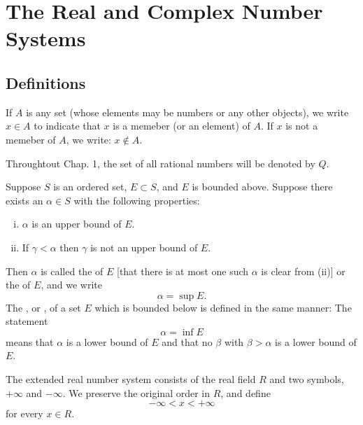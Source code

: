 \section{The Real and Complex Number Systems}
\subsection{Definitions}
\begin{deff}
	If $A$ is any set (whose elements may be numbers or any other objects), we write $x \in A$ to indicate that $x$ is a memeber (or an element) of $A$. If $x$ is not a memeber of $A$, we write: $x \notin A$.
\end{deff}

\begin{deff}
	Throughtout Chap. 1, the set of all rational numbers will be denoted by $Q$.
\end{deff}

\begin{deff}\label{def:supinf}
	Suppose $S$ is an ordered set, $E\subset S$, and $E$ is bounded above. Suppose there exists an $\alpha\in S$ with the following properties:
	\begin{enumerate}[(i)]
		\item $\alpha$ is an upper bound of $E$.
		\item If $\gamma <\alpha$ then $\gamma$ is not an upper bound of $E$.
	\end{enumerate}
	Then $\alpha$ is called the {} of $E$ [that there is at most one such $\alpha$ is clear from (ii)] or the {} of $E$, and we write $$\alpha=\sup E.$$ The {}, or {}, of a set $E$ which is bounded below is defined in the same manner: The statement $$\alpha = \inf E$$ means that $\alpha$ is a lower bound of $E$ and that no $\beta$ with $\beta>\alpha$ is a lower bound of $E$.
\end{deff}

\begin{deff}\label{def:infinity}
	The extended real number system consists of the real field $R$ and two symbols, $+\infty$ and $-\infty$. We preserve the original order in $R$, and define $$-\infty<x<+\infty$$ for every $x\in R$.
\end{deff}

